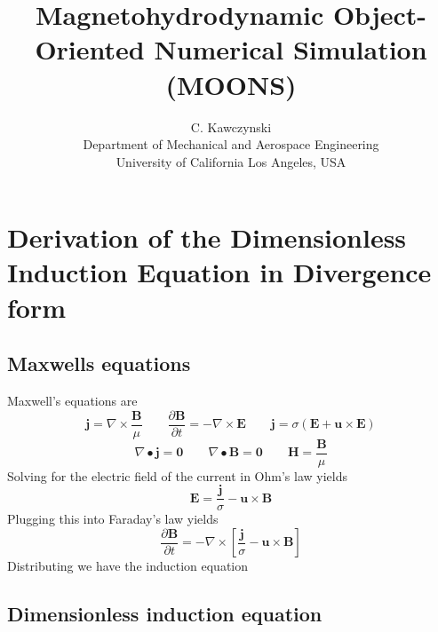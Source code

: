 \documentclass[11pt]{article}
\begin{document}
\doublespacing
\title{Magnetohydrodynamic Object-Oriented Numerical Simulation (MOONS)}
\author{C. Kawczynski \\
Department of Mechanical and Aerospace Engineering \\
University of California Los Angeles, USA\\
}
\maketitle

\section{Derivation of the Dimensionless Induction Equation in Divergence form}
\subsection{Maxwells equations}
Maxwell's equations are
\begin{equation}
\pmb{j} = \nabla \times \frac{\pmb{B}}{\mu}
\qquad
\frac{\partial \pmb{B}}{\partial t} = 
- \nabla \times \pmb{E}
\qquad
\pmb{j} = \sigma (\pmb{E} + \pmb{u}\times \pmb{E})
\end{equation}
\begin{equation}
\nabla \bullet \pmb{j} = \pmb{0}
\qquad
\nabla \bullet \pmb{B} = \pmb{0}
\qquad
\pmb{H} = \frac{\pmb{B}}{\mu}
\end{equation}
Solving for the electric field of the current in Ohm's law yields
\begin{equation}
\pmb{E} = \frac{\pmb{j}}{\sigma} - \pmb{u} \times \pmb{B}
\end{equation}
Plugging this into Faraday's law yields
\begin{equation}
\frac{\partial \pmb{B}}{\partial t} = 
- \nabla \times \left[ \frac{\pmb{j}}{\sigma}
- \pmb{u} \times \pmb{B} \right]
\end{equation}
Distributing we have the induction equation

\subsection{Dimensionless induction equation}
\end{document}
